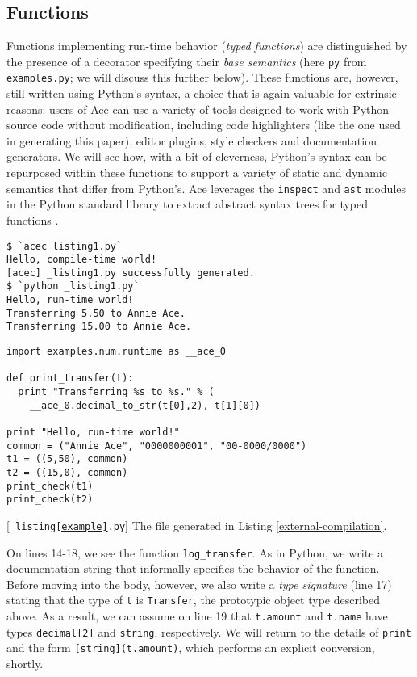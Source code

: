 \documentclass[10pt,preprint]{sigplanconf}
\begin{document}
\subsection{Functions}
Functions implementing run-time behavior (\emph{typed functions}) are distinguished by the presence of a decorator specifying their  \emph{base semantics} (here \verb|py| from \verb|examples.py|; we will discuss this further below). These functions are, however, still written using Python's syntax, a choice that is again valuable for extrinsic reasons: users of Ace can use a variety of  tools designed to work with Python source code  without  modification, including code highlighters (like the one used in generating this paper), editor plugins, style checkers and documentation generators. We will see how, with a bit of cleverness, Python's syntax can be repurposed within these functions to support a variety of static and dynamic semantics that differ from Python's. Ace  leverages the \verb|inspect| and \verb|ast| modules in the Python standard library to extract abstract syntax trees for typed functions \cite{python}. 
\begin{codelisting}
\begin{lstlisting}[style=Bash]
$ `acec listing1.py`
Hello, compile-time world!
[acec] _listing1.py successfully generated.
$ `python _listing1.py`
Hello, run-time world!
Transferring 5.50 to Annie Ace.
Transferring 15.00 to Annie Ace.
\end{lstlisting}
\caption{Compiling \texttt{listing\ref{example}.py} using \texttt{acec}. Both steps can be performed at once by writing \lstinline[style=Bash]{`ace listing1.py`} (line 3 will not be printed with this command).}
\label{external-compilation}
\end{codelisting}
\begin{codelisting}[t]
\begin{lstlisting}
import examples.num.runtime as __ace_0

def print_transfer(t):
  print "Transferring %s to %s." % (
    __ace_0.decimal_to_str(t[0],2), t[1][0])

print "Hello, run-time world!"
common = ("Annie Ace", "0000000001", "00-0000/0000")
t1 = ((5,50), common)
t2 = ((15,0), common)
print_check(t1)
print_check(t2)
\end{lstlisting}
\caption{[\texttt{\_listing\ref{example}.py}] The file generated in Listing \ref{external-compilation}.}
\label{example-out}
\end{codelisting}

On lines 14-18, we see the function \verb|log_transfer|. As in Python, we write a documentation string  that informally specifies the behavior of the function. Before moving into the body, however, we  also write a \emph{type signature} (line 17) stating that the type of \verb|t| is \verb|Transfer|, the prototypic object type described above. As a result, we can assume on line 19 that \verb|t.amount| and \verb|t.name| have types \verb|decimal[2]| and \verb|string|, respectively. We will return to the details of \verb|print| and the form \verb|[string](t.amount)|, which performs an explicit conversion, shortly.
\end{document}
